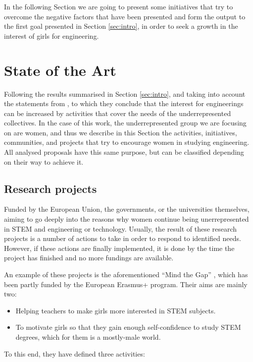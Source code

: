 \documentclass[journal,transmag]{IEEEtran}
\begin{document}
In the following Section we are going to present some initiatives that try to overcome the negative factors that have been presented and form the output to the first goal presented in Section \ref{sec:intro}, in order to seek a growth in the interest of girls for engineering.

\section{State of the Art}
\label{sec:EdA}

Following the results summarised in Section \ref{sec:intro}, and taking into account the statements from \cite{everis2012}, to which they conclude that the interest for engineerings can be increased by activities that cover the needs of the underrepresented collectives. In the case of this work, the underrepresented group we are focusing on are women, and thus we describe in this Section the activities, initiatives, communities, and projects that try to encourage women in studying engineering. All analysed proposals have this same purpose, but can be classified depending on their way to achieve it.

\subsection{Research projects}

Funded by the European Union, the governments, or the universities themselves, aiming to go deeply into the reasons why women continue being unerrepresented in STEM and engineering or technology. Usually, the result of these research projects is a number of actions to take in order to respond to identified needs. However, if these actions are finally implemented, it is done by the time the project has finished and no more fundings are available.

An example of these projects is the aforementioned ``Mind the Gap'' \cite{mtg:site}, which has been partly funded by the European Erasmus+ program. Their aims are mainly two:

\begin{itemize}
  \item Helping teachers to make girls more interested in STEM subjects.
  \item To motivate girls so that they gain enough self-confidence to study STEM degrees, which for them is a mostly-male world.
\end{itemize}

To this end, they have defined three activities:
\end{document}
